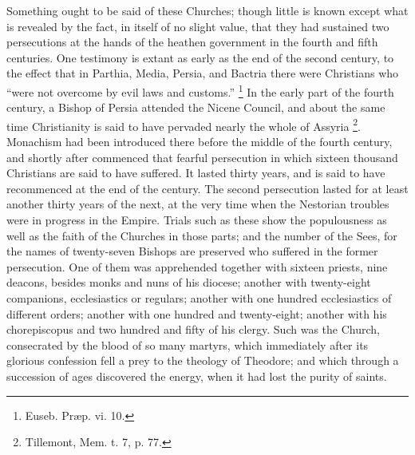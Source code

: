 Something ought to be said of these Churches; though little is
known except what is revealed by the fact, in itself of no slight
value, that they had sustained two persecutions at the hands of the
heathen government in the fourth and fifth centuries. One testimony is
extant as early as the end of the second century, to the effect that
in Parthia, Media, Persia, and Bactria there were Christians who
``were not overcome by evil laws and customs.'' \footnote{Euseb. Præp. vi. 10.} In the early part of the fourth century, a Bishop of Persia
attended the Nicene Council, and about the same time Christianity is
said to have pervaded nearly the whole of Assyria \footnote{Tillemont, Mem. t. 7, p. 77.}. Monachism had been introduced there before the middle of the
fourth century, and shortly after commenced that fearful persecution
in which sixteen thousand Christians are said to have suffered. It
lasted thirty years, and is said to have recommenced at the end of the
century. The second persecution lasted for at least another thirty
years of the next, at the very time when the Nestorian troubles were
in progress in the Empire. Trials such as these show the populousness
as well as the faith of the Churches in those parts; and the number of
the Sees, for the names of twenty-seven Bishops are preserved who
suffered in the former persecution. One of them was apprehended
together with sixteen priests, nine deacons, besides monks and nuns of
his diocese; another with twenty-eight companions, ecclesiastics or
regulars; another with one hundred ecclesiastics of different orders;
another with one hundred and twenty-eight; another with his
chorepiscopus and two hundred and fifty of his clergy. Such was the
Church, consecrated by the blood of so many martyrs, which
immediately after its glorious confession fell a prey to the theology
of Theodore; and which through a succession of ages discovered the
energy, when it had lost the purity of saints.


